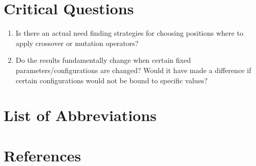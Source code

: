 \documentclass[oneside, notitlepage, twocolumn]{scrartcl}
\begin{document}
\section{Critical Questions}
\begin{enumerate}
    \item Is there an actual need finding strategies for choosing positions where to apply crossover or mutation operators?
    \item Do the results fundamentally change when certain fixed parameters/configurations are changed? Would it have made a difference if certain configurations would not be bound to specific values?
\end{enumerate}

\section{List of Abbreviations}
\begin{acronym}
\end{acronym}

\section{References}
\begingroup
\renewcommand{\section}[2]{}%
\nocite{*}
\printbibliography
\endgroup
\end{document}
